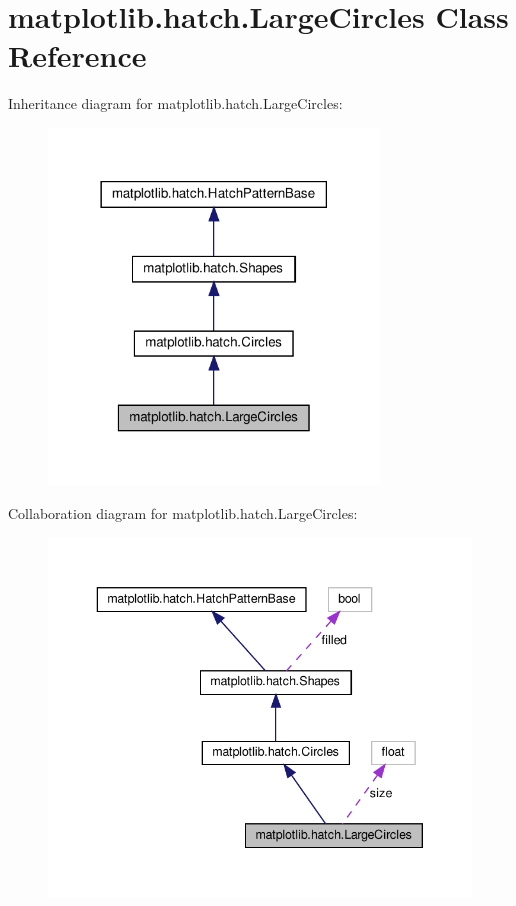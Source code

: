 \hypertarget{classmatplotlib_1_1hatch_1_1LargeCircles}{}\section{matplotlib.\+hatch.\+Large\+Circles Class Reference}
\label{classmatplotlib_1_1hatch_1_1LargeCircles}


Inheritance diagram for matplotlib.\+hatch.\+Large\+Circles\+:
\nopagebreak
\begin{figure}[H]
\begin{center}
\leavevmode
\includegraphics[width=249pt]{classmatplotlib_1_1hatch_1_1LargeCircles__inherit__graph}
\end{center}
\end{figure}


Collaboration diagram for matplotlib.\+hatch.\+Large\+Circles\+:
\nopagebreak
\begin{figure}[H]
\begin{center}
\leavevmode
\includegraphics[width=343pt]{classmatplotlib_1_1hatch_1_1LargeCircles__coll__graph}
\end{center}
\end{figure}

